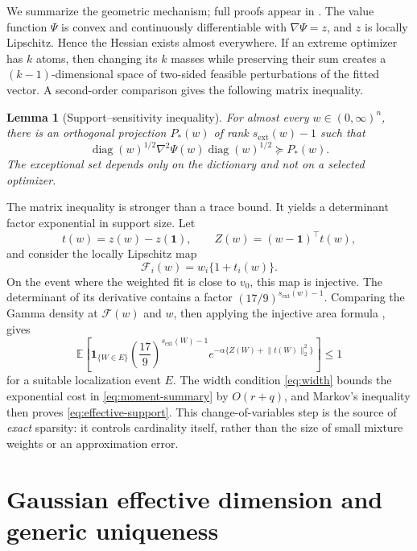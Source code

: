 \documentclass[11pt]{article}
\newtheorem{lemma}[lemma]{Lemma}
\theoremstyle{definition}
\theoremstyle{remark}
\DeclareMathOperator{\diag}{diag}
\newcommand{\EE}{\mathbb E}
\newcommand{\one}{\bm 1}
\newcommand{\norm}[1]{\lVert #1\rVert}
\begin{document}
We summarize the geometric mechanism; full proofs appear in
.  The value function $\Psi$ is convex and continuously
differentiable with $\nabla\Psi=z$, and $z$ is locally Lipschitz.  Hence the
Hessian exists almost everywhere.  If an extreme optimizer has $k$ atoms,
then changing its $k$ masses while preserving their sum creates a
$(k-1)$-dimensional space of two-sided feasible perturbations of the fitted
vector.  A second-order comparison gives the following matrix inequality.

\begin{lemma}[Support--sensitivity inequality]
\label{lem:hessian-summary}
For almost every $w\in(0,\infty)^n$, there is an orthogonal projection
$P_*(w)$ of rank $s_{\mathrm{ext}}(w)-1$ such that
\begin{equation}\label{eq:hessian-summary}
 \diag(w)^{1/2}\nabla^2\Psi(w)\diag(w)^{1/2}\succeq P_*(w).
\end{equation}
The exceptional set depends only on the dictionary and not on a selected
optimizer.
\end{lemma}

The matrix inequality is stronger than a trace bound.  It yields a determinant
factor exponential in support size.  Let
\[
 t(w)=z(w)-z(\one),
 \qquad Z(w)=(w-\one)^\top t(w),
\]
and consider the locally Lipschitz map
\begin{equation}\label{eq:change-map}
 \mathcal F_i(w)=w_i\{1+t_i(w)\}.
\end{equation}
On the event where the weighted fit is close to $v_0$, this map is injective.
The determinant of its derivative contains a factor
$(17/9)^{s_{\mathrm{ext}}(w)-1}$.  Comparing the Gamma density at
$\mathcal F(w)$ and $w$, then applying the injective area formula
\citep{evansgariepy2015}, gives
\begin{equation}\label{eq:moment-summary}
 \EE\left[\bm 1_{\{W\in E\}}
 \left(\frac{17}{9}\right)^{s_{\mathrm{ext}}(W)-1}
 e^{-\alpha\{Z(W)+\norm{t(W)}_2^2\}}\right]\le1
\end{equation}
for a suitable localization event $E$.  The width condition
\eqref{eq:width} bounds the exponential cost in \eqref{eq:moment-summary} by
$O(r+q)$, and Markov's inequality then proves
\eqref{eq:effective-support}.  This change-of-variables step is the source of
\emph{exact} sparsity: it controls cardinality itself, rather than the size of
small mixture weights or an approximation error.

\section{Gaussian effective dimension and generic uniqueness}
\label{sec:gaussian}
\end{document}
